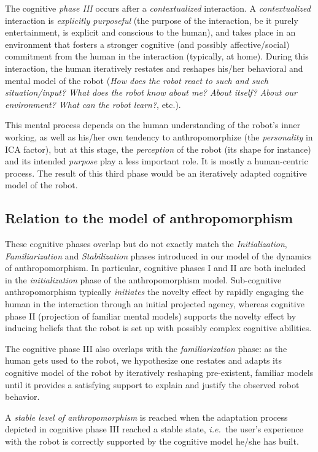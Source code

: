 \documentclass{frontiersSCNS} %
\newcommand{\ie}{{\textit{i.e.~}}}
\begin{document}
The cognitive \emph{phase III} occurs after a \emph{contextualized} interaction.
A \emph{contextualized} interaction is \emph{explicitly purposeful} (the purpose
of the interaction, be it purely entertainment, is explicit and conscious to the
human), and takes place in an environment that fosters a stronger cognitive (and
possibly affective/social) commitment from the human in the interaction
(typically, at home). During this interaction, the human iteratively restates
and reshapes his/her behavioral and mental model of the robot (\emph{How does
the robot react to such and such situation/input?  What does the robot know
about me? About itself? About our environment? What can the robot learn?}, etc.).

This mental process depends on the human understanding of the robot's
inner working, as well as his/her own tendency to anthropomorphize (the
\emph{personality} in ICA factor), but at this
stage, the \emph{perception} of the robot (its shape for instance) and its
intended \emph{purpose} play a less important role. It is mostly a human-centric
process.  The result of this third phase would be an iteratively adapted
cognitive model of the robot.


\subsection*{Relation to the model of anthropomorphism}

These cognitive phases overlap but do not exactly match the
\emph{Initialization}, \emph{Familiarization} and \emph{Stabilization} phases
introduced in our model of the dynamics of anthropomorphism. In particular,
cognitive phases I and II are both included in the \emph{initialization} phase
of the anthropomorphism model. Sub-cognitive anthropomorphism typically
\emph{initiates} the novelty effect by rapidly engaging the human in the
interaction through an initial projected agency, whereas cognitive phase II
(projection of familiar mental models) supports the novelty effect by inducing
beliefs that the robot is set up with possibly complex cognitive abilities.

The cognitive phase III also overlaps with the \emph{familiarization} phase: as
the human gets used to the robot, we hypothesize one restates and adapts its
cognitive model of the robot by iteratively reshaping pre-existent, familiar
models until it provides a satisfying support to explain and justify the
observed robot behavior.

A \emph{stable level of anthropomorphism} is reached when the adaptation process
depicted in cognitive phase III reached a stable state, \ie the user's
experience with the robot is correctly supported by the cognitive model he/she
has built.
\end{document}
